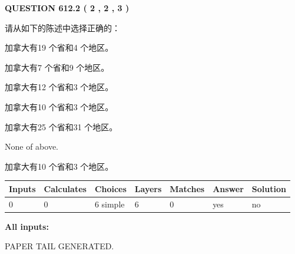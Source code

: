 \documentclass{ctexart}
\begin{document}
   
  
\vspace{0.2in}
  
{\textbf{\Large{QUESTION
612.2 
 ( 2 , 2 , 3 )
}}}
  
  
请从如下的陈述中选择正确的：
 
 
加拿大有19 个省和4 个地区。
 
 
加拿大有7 个省和9 个地区。
 
 
加拿大有12 个省和3 个地区。
 
 
加拿大有10 个省和3 个地区。
 
 
加拿大有25 个省和31 个地区。
 
 
 None of above.
 
 
\noindent{}
 
 
加拿大有10 个省和3 个地区。
 
 
\noindent{}
 
 
   
   
   
   
\noindent\begin{tabular}{|l|l|l|l|l|l|l|}
 \hline
Inputs & Calculates & Choices & Layers & Matches & Answer & Solution \\ \hline
 0  & 
 0  & 
 6
  simple  
  & 
 6  & 
 0  & 
  yes & 
  no 
  \\ \hline
 \end{tabular}
   
   
   
   
\noindent{}
   
   
   
   
\noindent\vspace{0.1in}\hspace{-0.08in} {\textbf{\Large{All inputs: }}}
   
   
   
   
   
   
 \vspace{0.2in}
 
   
   
\vspace{2.0in} PAPER TAIL GENERATED.
   
\end{document}
